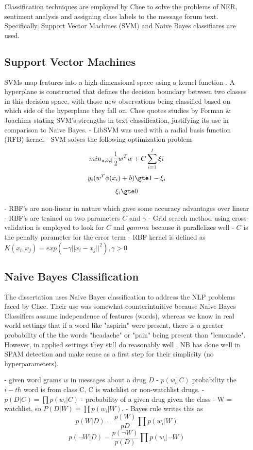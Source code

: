 \documentclass[twoside,11pt]{article}
\begin{document}
Classification techniques are employed by Chee to solve the problems of NER,
sentiment analysis and assigning class labels to the message forum text. Specifically,
Support Vector Machines (SVM) and Naive Bayes classifiares are used.


\subsection{Support Vector Machines}
SVMs map features into a high-dimensional space using a kernel function \citep{Cortes and Vapnik}.
A hyperplane is constructed that defines the decision boundary between two classes
in this decision space, with those new observations being classified based on which
side of the hyperplane they fall on. Chee quotes studies by Forman & Joachims stating
SVM's strengths in text classification, justifying its use in comparison to Naive
Bayes.
- LibSVM was used with a radial basis function (RFB) kernel
- SVM solves the following optimization problem
\[
  min_{u, b, \xi} \frac{1}{2}w^{T}w + C \sum_{i=1}^{l}\xi i \\
\]
\[
  y_{i}(w^{T}\phi(x_{i}) + b) \gte 1 - \xi_{i}
\]
\[
  \xi_{i} \gte 0
\]

- RBF's are non-linear in nature which gave some accuracy advantages over linear
- RBF's are trained on two parameters $C$ and $\gamma$
- Grid search method using cross-validation is employed to look for $C$ and $gamma$
because it parallelizes well
- $C$ is the penalty parameter for the error term
- RBF kernel is defined as $K(x_i, x_j) = exp(-\gamma||x_i - x_j||^{2}), \gamma > 0$

\subsection{Naive Bayes Classification}
The dissertation uses Naive Bayes classification to address the NLP problems
faced by Chee.  Their use was somewhat counterintuitive because Naive Bayes
Classifiers assume independence of features (words), whereas we know in real world settings
that if a word like "aspirin" were present, there is a greater probability of the
the words "headache" or "pain" being present than "lemonade". However, in
applied settings they still do reasonably well \citep{Manning, 1999}. NB has done well
in SPAM detection \citep{Sahami} and make sense as a first step for their simplicity (no
hyperparameters).

- given word grams $w$ in messages about a drug $D$
- $p(w_{i}|C)$ probability the $i-th$ word is from class C, C is watchlist or
non-watchlist drugs.
- $p(D|C) = \prod p(w_{i}|C)$ - probability of a given drug given the class
- W = watchlist, so $P(D|W) = \prod p(w_{i}|W)$.
- Bayes rule writes this as
\[
  p(W|D) = \frac{p(W)}{p{D}} \prod p(w_{i}|W)
\]
\[
  p(\neg{W}|D) = \frac{p(\neg{W})}{p(D)} \prod p(w_{i}|\neg{W})
\]
\end{document}
